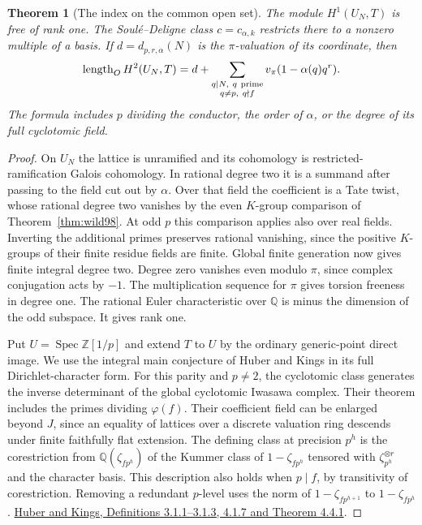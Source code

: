 \documentclass[a4paper,11pt]{article}
\newtheorem{theorem}[proposition]{Theorem}
\theoremstyle{definition}
\theoremstyle{remark}
\numberwithin{equation}{section}
\begin{document}
\begin{theorem}[The index on the common open set]\leavevmode
\label{thm:openindex269}
The module \(H^1(U_N,T)\) is free of rank one. The
Soul\'e--Deligne class \(c=c_{\alpha,k}\) restricts there to a
nonzero multiple of a basis. If \(d=d_{p,r,\alpha}(N)\)
is the \(\pi\)-valuation of its coordinate, then
\[
 \operatorname{length}_O H^2(U_N,T)
  =d+\sum_{\substack{q\mid N,\ q\ {\rm prime}\\q\ne p,\ q\nmid f}}
                      v_\pi(1-\alpha(q)q^r).
\]
The formula includes \(p\) dividing the conductor, the order
of \(\alpha\), or the degree of its full cyclotomic field.
\end{theorem}
\begin{proof}
On \(U_N\) the lattice is unramified and its cohomology is
restricted-ramification Galois cohomology. In rational degree
two it is a summand after passing to the field cut out by
\(\alpha\). Over that field the coefficient is a Tate twist,
whose rational degree two vanishes by the even \(K\)-group
comparison of Theorem~\ref{thm:wild98}. At odd \(p\) this
comparison applies also over real fields. Inverting the
additional primes preserves rational vanishing, since the
positive \(K\)-groups of their finite residue fields are finite.
Global finite generation now gives finite integral degree two.
Degree zero vanishes even modulo \(\pi\), since complex
conjugation acts by \(-1\). The multiplication sequence for
\(\pi\) gives torsion freeness in degree one. The rational
Euler characteristic over \(\mathbb Q\) is minus the dimension
of the odd subspace. It gives rank one.

Put \(U=\operatorname{Spec}\mathbb Z[1/p]\) and extend \(T\)
to \(U\) by the ordinary generic-point direct image. We use
the integral main conjecture of Huber and Kings in its full
Dirichlet-character form. For this parity and \(p\ne2\),
the cyclotomic class generates the inverse determinant of the
global cyclotomic Iwasawa complex. Their theorem includes the
primes dividing \(\varphi(f)\). Their coefficient field can
be enlarged beyond \(J\), since an equality of lattices over
a discrete valuation ring descends under finite faithfully
flat extension. The defining class at precision \(p^h\) is
the corestriction from \(\mathbb Q(\zeta_{fp^h})\) of the
Kummer class of \(1-\zeta_{fp^h}\) tensored with
\(\zeta_{p^h}^{\otimes r}\) and the character basis. This
description also holds when \(p\mid f\), by transitivity of
corestriction. Removing a redundant \(p\)-level uses the norm
of \(1-\zeta_{fp^{h+1}}\) to \(1-\zeta_{fp^h}\).
\href{https://arxiv.org/pdf/math/0101071\#page=22}{Huber and
Kings, Definitions 3.1.1--3.1.3, 4.1.7 and Theorem 4.4.1}.


\end{proof}
\end{document}
